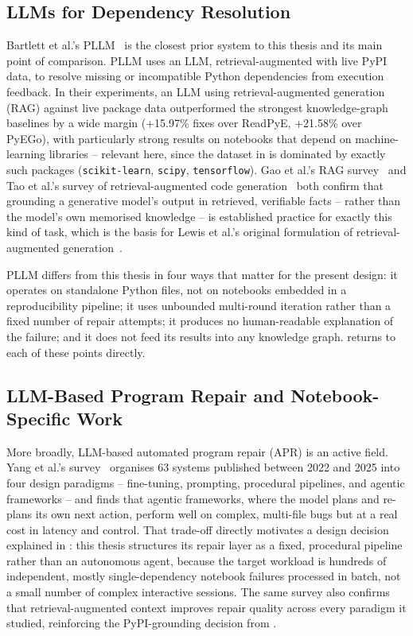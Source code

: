 \subsection{LLMs for Dependency Resolution}
\label{sec:rw-llm-dep}

Bartlett et al.'s PLLM~\cite{bartlett2025pllm} is the closest prior system to
this thesis and its main point of comparison. PLLM uses an LLM,
retrieval-augmented with live PyPI data, to resolve missing or incompatible
Python dependencies from execution feedback. In their experiments, an
LLM using retrieval-augmented generation (RAG) against live package data
outperformed the strongest knowledge-graph baselines by a wide margin
(+15.97\% fixes over ReadPyE, +21.58\% over PyEGo), with particularly strong
results on notebooks that depend on machine-learning libraries -- relevant
here, since the dataset in  is dominated by
exactly such packages (\texttt{scikit-learn}, \texttt{scipy},
\texttt{tensorflow}). Gao et al.'s RAG survey~\cite{gao2024ragsurvey} and Tao
et al.'s survey of retrieval-augmented code generation~\cite{tao2025racg}
both confirm that grounding a generative model's output in retrieved,
verifiable facts -- rather than the model's own memorised knowledge -- is
established practice for exactly this kind of task, which is the basis for
Lewis et al.'s original formulation of retrieval-augmented
generation~\cite{lewis2020rag}.

PLLM differs from this thesis in four ways that matter for the present
design: it operates on standalone Python files, not on notebooks embedded in
a reproducibility pipeline; it uses unbounded multi-round iteration rather
than a fixed number of repair attempts; it produces no human-readable
explanation of the failure; and it does not feed its results into any
knowledge graph.  returns to each of these points directly.

\subsection{LLM-Based Program Repair and Notebook-Specific Work}
\label{sec:rw-apr}

More broadly, LLM-based automated program repair (APR) is an active field.
Yang et al.'s survey~\cite{yang2025aprsurvey} organises 63 systems published
between 2022 and 2025 into four design paradigms -- fine-tuning, prompting,
procedural pipelines, and agentic frameworks -- and finds that agentic
frameworks, where the model plans and re-plans its own next action, perform
well on complex, multi-file bugs but at a real cost in latency and control.
That trade-off directly motivates a design decision explained in
: this thesis structures its repair layer as a fixed,
procedural pipeline rather than an autonomous agent, because the target
workload is hundreds of independent, mostly single-dependency notebook
failures processed in batch, not a small number of complex interactive
sessions. The same survey also confirms that retrieval-augmented context
improves repair quality across every paradigm it studied, reinforcing the
PyPI-grounding decision from .

